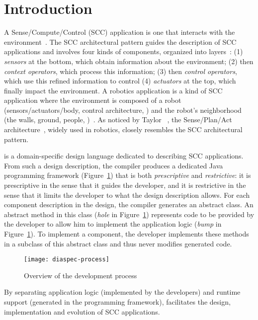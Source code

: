 \section{Introduction}

A Sense/Compute/Control (SCC) application is one that interacts with
the environment~\cite{Tayl09a}. The SCC architectural pattern
guides the description of SCC applications and involves four kinds of
components, organized into layers~\cite{Cass11a,Edwar09a}: (1)
\emph{sensors} at the bottom, which obtain information about the
environment; (2) then \emph{context operators}, which process this
information; (3) then \emph{control operators}, which use this refined
information to control (4) \emph{actuators} at the top, which finally
impact the environment. A robotics application is a kind of SCC
application where the environment is composed of a robot
(sensors/actuators/body, control architecture, \etc{}) and the robot's
neighborhood (the walls, ground, people, \etc{})~\cite{Sicil08a}. As
noticed by Taylor \etal{}~\cite{Tayl09a}, the Sense/Plan/Act
architecture~\cite{Sicil08a}, widely used in robotics, closely
resembles the SCC architectural pattern.

\diaspec{} is a domain-specific design language dedicated to describing SCC
applications. From such a design description, the \diaspec{} compiler
produces a dedicated Java programming framework
(Figure~\ref{fig:diaspec-process}) that is both \emph{prescriptive}
and \emph{restrictive}: it is prescriptive in the sense that it guides
the developer, and it is restrictive in the sense that it limits the
developer to what the design description allows. For each component
description in the design, the compiler generates an abstract class.
An abstract method in this class (\emph{hole} in
Figure~\ref{fig:diaspec-process}) represents code to be provided by
the developer to allow him to implement the application logic
(\textit{bump} in Figure~\ref{fig:diaspec-process}). To implement a
component, the developer implements these methods in a subclass of
this abstract class and thus never modifies generated code.

\begin{figure}
  \centering
  \texttt{[image: diaspec-process]}
  \caption{Overview of the \diaspec{} development process}
  \label{fig:diaspec-process}
\end{figure}


By separating application logic (implemented by the developers) and
runtime support (generated in the programming framework), \diaspec{}
facilitates the design, implementation and evolution of SCC
applications. 

